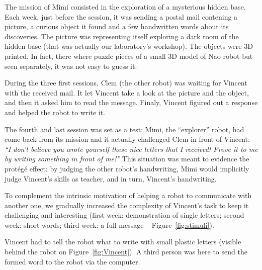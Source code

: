 \documentclass{sig-alternate}
\begin{document}
The mission of Mimi consisted in the exploration of a mysterious hidden
base. Each week, just before the session, it was sending a postal mail contening
a picture, a curious object it found and a few handwritten words about its discoveries. 
The picture was representing itself exploring 
a dark room of the hidden base (that was actually our laboratory's workshop). 
The objects were 3D printed. In fact, there where puzzle pieces of a small 3D 
model of Nao robot but seen separately, it was not easy to guess it.

During the three first sessions, Clem (the other robot) was waiting for Vincent
with the received mail. It let Vincent take a look at the picture and the object,
and then it asked him to read the message.
Finaly, Vincent figured out a response and helped the robot to write it.

The fourth and last session was set as a test: Mimi, the ``explorer'' robot,
had come back from its mission and it actually challenged Clem in
front of Vincent: \emph{``I don't believe you wrote yourself these nice letters that I
received! Prove it to me by writing something in front of me!''} This situation
was meant to evidence the prot\'eg\'e effect: by judging the other robot's
handwriting, Mimi would implicitly judge Vincent's skills as
teacher, and in turn, Vincent's handwriting.

To complement the intrinsic motivation of helping a robot to communicate with another one, we
gradually increased the complexity of Vincent's task to keep it challenging and
interesting (first week: demonstration of single letters; second week:
short words; third week: a full message -- Figure~\ref{fig:stimuli}).

Vincent had to tell the robot what to write with small plastic letters (visible
behind the robot on Figure~\ref{fig:Vincent}). A third person was here to send
the formed word to the robot via the computer.

\end{document}

